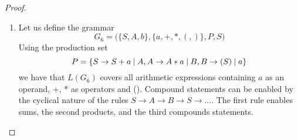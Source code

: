\documentclass[11pt]{article}
\begin{document}
\begin{proof}
\begin{enumerate}
        \item Let us define the grammar
        \begin{equation}
            G_6 = \big(\{S, A, b\}, \{a, +, *, (, )\}, P, S\big)
        \end{equation}
        Using the production set
        \begin{equation}
            P = \{
                S \to S + a \hspace{0.25em}|\hspace{0.25em} A,
                A \to A * a \hspace{0.25em}|\hspace{0.25em} B,
                B \to (S) \hspace{0.25em}|\hspace{0.25em} a
            \}
        \end{equation}
        we have that $L(G_6)$ covers all arithmetic expressions containing 
        $a$ as an operand, +, * as operators and (). Compound statements
        can be enabled by the cyclical nature of the rules $S \to A \to B \to S \to \ldots$.
        The first rule enables sums, the second products, and the third compounds
        statements.
    \end{enumerate}
    \end{proof}
\end{document}
